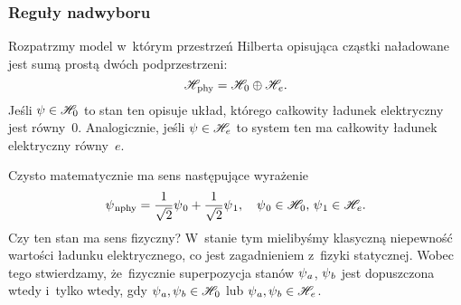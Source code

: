 \documentclass[10pt,t]{beamer}
\begin{document}
\begin{frame}
  \frametitle{Reguły nadwyboru}


  Rozpatrzmy model w~którym przestrzeń Hilberta opisująca cząstki
  naładowane jest sumą prostą dwóch podprzestrzeni:
  \begin{equation}
    \label{eq:Glowne-rodzaje-problemow-podczerwonych-01}
    \mathcal{H}_{ \hspace{0.07em} \text{phy} } =
    \mathcal{H}_{ \hspace{0.07em} 0 } \oplus \mathcal{H}_{ \hspace{0.07em} e }.
  \end{equation}
  Jeśli $\psi \in \mathcal{H}_{ 0 }$ to stan ten opisuje układ, którego całkowity
  ładunek elektryczny jest równy~$0$. Analogicznie, jeśli
  $\psi \in \mathcal{H}_{ e }$ to system ten ma całkowity ładunek elektryczny
  równy~$e$.

  Czysto matematycznie ma sens następujące wyrażenie
  \begin{equation}
    \label{eq:Glowne-rodzaje-problemow-podczerwonych-02}
    \psi_{ \hspace{0.07em} \text{nphy} } =
    \frac{ 1 }{ \sqrt{ 2 } } \psi_{ \hspace{0.07em} 0 } +
    \frac{ 1 }{ \sqrt{ 2 } } \psi_{ \hspace{0.07em} 1 }, \quad
    \psi_{ \hspace{0.07em} 0 } \in \mathcal{H}_{ \hspace{0.07em} 0 }, \,
    \psi_{ \hspace{0.07em} 1 } \in \mathcal{H}_{ \hspace{0.07em} e }.
  \end{equation}
  Czy ten stan ma sens fizyczny? W~stanie tym mielibyśmy \alert{klasyczną}
  niepewność wartości ładunku elektrycznego, co jest zagadnieniem z~fizyki
  statycznej. Wobec tego stwierdzamy, że~\alert{fizycznie} superpozycja
  stanów $\psi_{ \hspace{0.05em} a }$, $\psi_{ \hspace{0.05em} b }$ jest dopuszczona wtedy
  i~tylko wtedy,
  gdy $\psi_{ \hspace{0.05em} a }, \psi_{ \hspace{0.05em} b } \in \mathcal{H}_{ \hspace{0.07em} 0 }$
  lub $\psi_{ \hspace{0.05em} a }, \psi_{ \hspace{0.05em} b } \in \mathcal{H}_{ \hspace{0.07em} e }$.

\end{frame}
\end{document}

